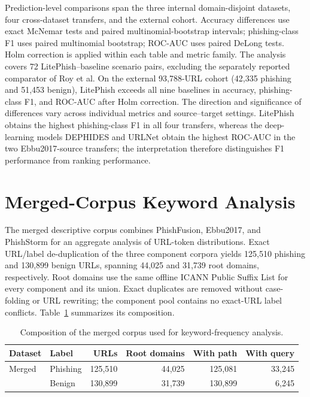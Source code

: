 \documentclass[10pt]{article}
\newcommand{\blue}[1]{{\color{black}#1}}
\begin{document}
Prediction-level comparisons span the three internal domain-disjoint datasets, four cross-dataset transfers, and the external cohort. Accuracy differences use exact McNemar tests and paired multinomial-bootstrap intervals; phishing-class F1 uses paired multinomial bootstrap; ROC-AUC uses paired DeLong tests. Holm correction is applied within each table and metric family. The analysis covers 72 LitePhish--baseline scenario pairs, excluding the separately reported comparator of Roy et al. On the external {\color{supportingtext}93,788-URL cohort (42,335 phishing and 51,453 benign)}, LitePhish exceeds all nine baselines in accuracy, phishing-class F1, and ROC-AUC after Holm correction. {\color{supportingtext}The direction and significance of differences vary across individual metrics and source--target settings. LitePhish obtains the highest phishing-class F1 in all four transfers, whereas the deep-learning models DEPHIDES and URLNet obtain the highest ROC-AUC in the two Ebbu2017-source transfers; the interpretation therefore distinguishes F1 performance from ranking performance.}

\section{Merged-Corpus Keyword Analysis}

The merged descriptive corpus combines PhishFusion, Ebbu2017, and PhishStorm for an aggregate analysis of URL-token distributions. \blue{Exact URL/label de-duplication of the three component corpora yields 125,510 phishing and 130,899 benign URLs, spanning 44,025 and 31,739 root domains, respectively. Root domains use the same offline ICANN Public Suffix List for every component and its union. Exact duplicates are removed without case-folding or URL rewriting; the component pool contains no exact-URL label conflicts.} Table~\ref{tab:merged_interpretability} summarizes its composition.

\begin{table}[ht]
\centering
\caption{Composition of the merged corpus used for keyword-frequency analysis.}
\label{tab:merged_interpretability}
\small
\begin{tabular}{llrrrr}
\toprule
Dataset & Label & URLs & Root domains & With path & With query \\
\midrule
Merged & Phishing & \blue{125,510} & \blue{44,025} & \blue{125,081} & \blue{33,245} \\
       & Benign   & 130,899 & \blue{31,739} & \blue{130,899} & 6,245 \\
\bottomrule
\end{tabular}
\end{table}
\end{document}
